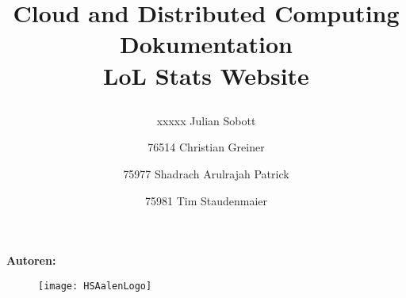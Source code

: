 


\title{\begin{center}\fontsize{40bp}{40bp}\selectfont\color{DarkBlue}
Cloud and Distributed Computing Dokumentation \\ [20pt]
\color{black}
\fontsize{16bp}{16bp}\selectfont
\fontsize{30bp}{30bp}\selectfont
\color{LightBlue}
LoL Stats Website\\
\fontsize{10bp}{10bp}\selectfont
\color{black}
\bigskip
\end{center}
}
\maketitle

\date{}
\begin{center}
\textbf{\fontsize{12bp}{12bp}\selectfont
Autoren:\\}
\bigskip
\author{xxxxx Julian Sobott\\ 
\and	 76514 Christian Greiner\\
\and 75977 Shadrach Arulrajah Patrick\\
\and 75981 Tim Staudenmaier
}
\end{center}
\begin{figure}
\centering
\texttt{[image: HSAalenLogo]}
\end{figure}

\newpage
			

\setcounter{page}{1} %

{\hypersetup{linkcolor=black}
\tableofcontents
}
\newpage